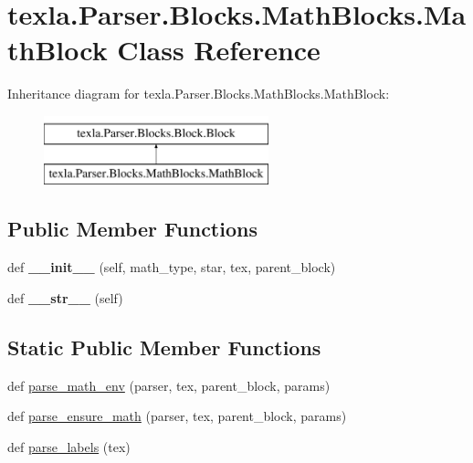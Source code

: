 \hypertarget{classtexla_1_1Parser_1_1Blocks_1_1MathBlocks_1_1MathBlock}{}\section{texla.\+Parser.\+Blocks.\+Math\+Blocks.\+Math\+Block Class Reference}
\label{classtexla_1_1Parser_1_1Blocks_1_1MathBlocks_1_1MathBlock}
Inheritance diagram for texla.\+Parser.\+Blocks.\+Math\+Blocks.\+Math\+Block\+:\begin{figure}[H]
\begin{center}
\leavevmode
\includegraphics[height=2.000000cm]{classtexla_1_1Parser_1_1Blocks_1_1MathBlocks_1_1MathBlock}
\end{center}
\end{figure}
\subsection*{Public Member Functions}
\begin{DoxyCompactItemize}
\item 
\hypertarget{classtexla_1_1Parser_1_1Blocks_1_1MathBlocks_1_1MathBlock_aad8c1b85cdbff22d1ba54ad05afaec37}{}\label{classtexla_1_1Parser_1_1Blocks_1_1MathBlocks_1_1MathBlock_aad8c1b85cdbff22d1ba54ad05afaec37} 
def {\bfseries \+\_\+\+\_\+init\+\_\+\+\_\+} (self, math\+\_\+type, star, tex, parent\+\_\+block)
\item 
\hypertarget{classtexla_1_1Parser_1_1Blocks_1_1MathBlocks_1_1MathBlock_a50441f166a75cb41b14acc2f54005fdd}{}\label{classtexla_1_1Parser_1_1Blocks_1_1MathBlocks_1_1MathBlock_a50441f166a75cb41b14acc2f54005fdd} 
def {\bfseries \+\_\+\+\_\+str\+\_\+\+\_\+} (self)
\end{DoxyCompactItemize}
\subsection*{Static Public Member Functions}
\begin{DoxyCompactItemize}
\item 
def \hyperlink{classtexla_1_1Parser_1_1Blocks_1_1MathBlocks_1_1MathBlock_ac8726dcbb217a6fe85cfd493967bc88e}{parse\+\_\+math\+\_\+env} (parser, tex, parent\+\_\+block, params)
\item 
def \hyperlink{classtexla_1_1Parser_1_1Blocks_1_1MathBlocks_1_1MathBlock_a1042d3f5eb3d461418397c8f02695dc6}{parse\+\_\+ensure\+\_\+math} (parser, tex, parent\+\_\+block, params)
\item 
def \hyperlink{classtexla_1_1Parser_1_1Blocks_1_1MathBlocks_1_1MathBlock_a0cfddf038e1062d9f24763dc604bebdb}{parse\+\_\+labels} (tex)
\end{DoxyCompactItemize}
